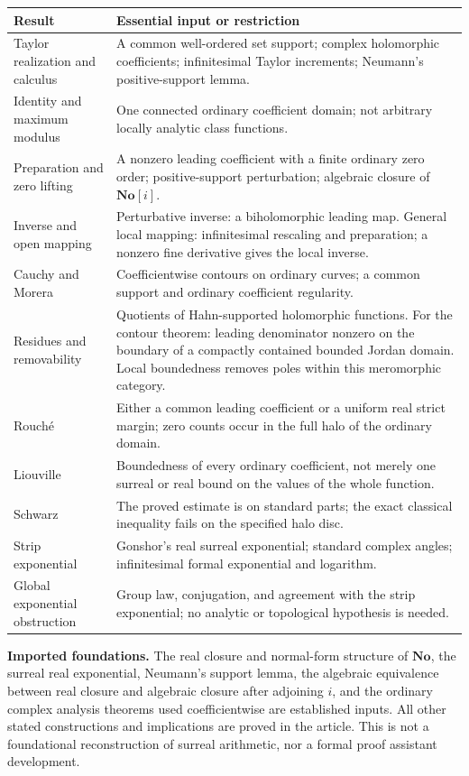 \documentclass[11pt,letterpaper]{article}
\numberwithin{equation}{section}
\theoremstyle{definition}
\theoremstyle{remark}
\newcommand{\No}{\mathbf{No}}
\begin{document}
\begin{longtable}{@{}p{}p{}@{}}
\toprule
\textbf{Result} & \textbf{Essential input or restriction}\\
\midrule
\endhead
Taylor realization and calculus & A common well-ordered set support; complex
holomorphic coefficients; infinitesimal Taylor increments; Neumann's
positive-support lemma.\\[4pt]
Identity and maximum modulus & One connected ordinary coefficient domain;
not arbitrary locally analytic class functions.\\[4pt]
Preparation and zero lifting & A nonzero leading coefficient with a finite
ordinary zero order; positive-support perturbation; algebraic closure of
$\No[i]$.\\[4pt]
Inverse and open mapping & Perturbative inverse: a biholomorphic leading map.
General local mapping: infinitesimal rescaling and preparation; a nonzero
fine derivative gives the local inverse.\\[4pt]
Cauchy and Morera & Coefficientwise contours on ordinary curves; a common
support and ordinary coefficient regularity.\\[4pt]
Residues and removability & Quotients of Hahn-supported holomorphic functions.
For the contour theorem: leading denominator nonzero on the boundary of a
compactly contained bounded Jordan domain. Local boundedness removes poles
within this meromorphic category.\\[4pt]
Rouch\'e & Either a common leading coefficient or a uniform real strict
margin; zero counts occur in the full halo of the ordinary domain.\\[4pt]
Liouville & Boundedness of every ordinary coefficient, not merely one
surreal or real bound on the values of the whole function.\\[4pt]
Schwarz & The proved estimate is on standard parts; the exact classical
inequality fails on the specified halo disc.\\[4pt]
Strip exponential & Gonshor's real surreal exponential; standard complex
angles; infinitesimal formal exponential and logarithm.\\[4pt]
Global exponential obstruction & Group law, conjugation, and agreement with
the strip exponential; no analytic or topological hypothesis is needed.\\
\bottomrule
\end{longtable}

\noindent\textbf{Imported foundations.}
The real closure and normal-form structure of $\No$, the surreal real
exponential, Neumann's support lemma, the algebraic equivalence between real
closure and algebraic closure after adjoining $i$, and the ordinary complex
analysis theorems used coefficientwise are established inputs. All other
stated constructions and implications are proved in the article. This is not
a foundational reconstruction of surreal arithmetic, nor a formal proof
assistant development.
\end{document}
